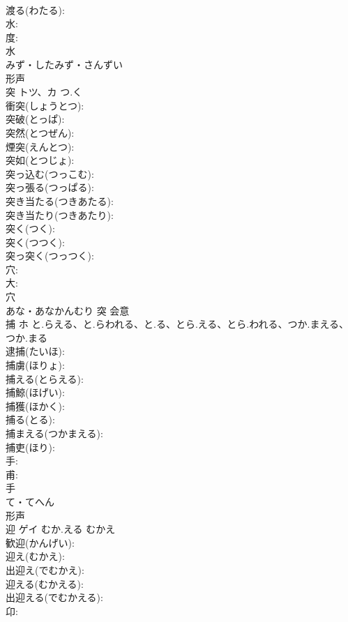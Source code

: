 \documentclass[8pt]{extreport}
\begin{document}
\begin{CJK}{UTF8}{min}
\\	渡る(わたる): 
\\	水: 
\\	度: 
\\	水	
\\	みず・したみず・さんずい	
\\	形声 
\\	突	トツ、カ	つ.く		
\\	衝突(しょうとつ): 
\\	突破(とっぱ): 
\\	突然(とつぜん): 
\\	煙突(えんとつ): 
\\	突如(とつじょ): 
\\	突っ込む(つっこむ): 
\\	突っ張る(つっぱる): 
\\	突き当たる(つきあたる): 
\\	突き当たり(つきあたり): 
\\	突く(つく): 
\\	突く(つつく): 
\\	突っ突く(つっつく): 
\\	穴: 
\\	大: 
\\	穴	
\\	あな・あなかんむり	突	会意 
\\	捕	ホ	と.らえる、と.らわれる、と.る、とら.える、とら.われる、つか.まえる、つか.まる		
\\	逮捕(たいほ): 
\\	捕虜(ほりょ): 
\\	捕える(とらえる): 
\\	捕鯨(ほげい): 
\\	捕獲(ほかく): 
\\	捕る(とる): 
\\	捕まえる(つかまえる): 
\\	捕吏(ほり): 
\\	手: 
\\	甫: 
\\	手	
\\	て・てへん	
\\	形声 
\\	迎	ゲイ	むか.える	むかえ	
\\	歓迎(かんげい): 
\\	迎え(むかえ): 
\\	出迎え(でむかえ): 
\\	迎える(むかえる): 
\\	出迎える(でむかえる): 
\\	卬: 

\end{CJK}
\end{document}
